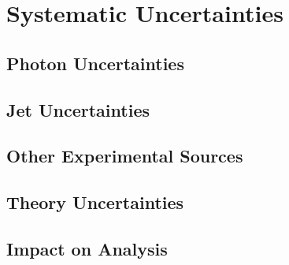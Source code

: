 \chapter{Systematic Uncertainties\label{ch:uncertainties}}

\section{Photon Uncertainties\label{sec:photonunc}}

\section{Jet Uncertainties\label{sec:jetunc}}

\section{Other Experimental Sources\label{sec:otherunc}}

\section{Theory Uncertainties\label{sec:theoryunc}}

\section{Impact on Analysis\label{sec:uncimpact}}


